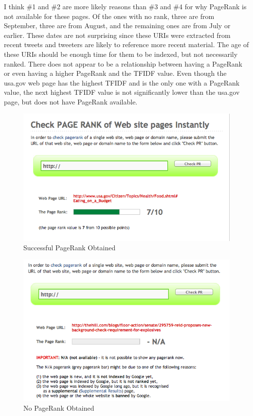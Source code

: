 \documentclass{article}
\begin{document}
I think \#1 and \#2 are more likely reasons than \#3 and \#4 for why PageRank is not available for these pages. Of the ones with no rank, three are from September, three are from August, and the remaining ones are from July or earlier. These dates are not surprising since these URIs were extracted from recent tweets and tweeters are likely to reference more recent material. The age of these URIs should be enough time for them to be indexed, but not necessarily ranked. There does not appear to be a relationship between having a PageRank or even having a higher PageRank and the TFIDF value. Even though the usa.gov web page has the highest TFIDF and is the only one with a PageRank value, the next highest TFIDF value is not significantly lower than the usa.gov page, but does not have PageRank available.

\begin{figure}[H]
\centering
\includegraphics[scale=0.50]{q3/pagerankchecker}
\caption{Successful PageRank Obtained}
\label{prsuccess}
\end{figure}

\begin{figure}[H]
\centering
\includegraphics[scale=0.50]{q3/pagerankna}
\caption{No PageRank Obtained}
\label{unsuccessful}
\end{figure}
\end{document}
